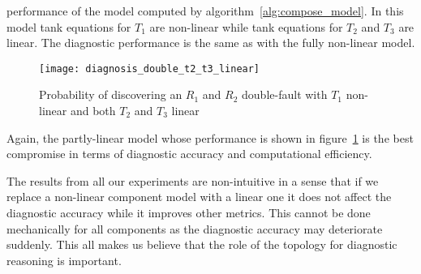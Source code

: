 performance of the model computed by
algorithm~\ref{alg:compose_model}. In this model tank equations for
$T_1$ are non-linear while tank equations for $T_2$ and $T_3$ are
linear. The diagnostic performance is the same as with the fully
non-linear model.
%
\begin{figure}[htb]
  \centering
  \texttt{[image: diagnosis\_double\_t2\_t3\_linear]}
  \caption{Probability of discovering an $R_1$ and $R_2$ double-fault with $T_1$ non-linear and both $T_2$ and $T_3$ linear}
  \label{fig:diagnosis_double_t2_t3_linear}
\end{figure}
\par
%
Again, the partly-linear model whose performance is shown in
figure~\ref{fig:diagnosis_double_t2_t3_linear} is the best
compromise in terms of diagnostic accuracy and computational
efficiency.
\par
The results from all our experiments are non-intuitive in a sense that
if we replace a non-linear component model with a linear one it does
not affect the diagnostic accuracy while it improves other
metrics. This cannot be done mechanically for all components as the
diagnostic accuracy may deteriorate suddenly. This all makes us believe
that the role of the topology for diagnostic reasoning is important.
